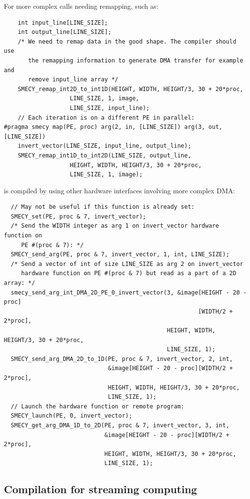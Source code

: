 \documentclass[a4paper]{article}
\begin{document}
For more complex calls needing remapping, such as:
\begin{lstlisting}
    int input_line[LINE_SIZE];
    int output_line[LINE_SIZE];
    /* We need to remap data in the good shape. The compiler should use
       the remapping information to generate DMA transfer for example and
       remove input_line array */
    SMECY_remap_int2D_to_int1D(HEIGHT, WIDTH, HEIGHT/3, 30 + 20*proc,
                   LINE_SIZE, 1, image,
                   LINE_SIZE, input_line);
    // Each iteration is on a different PE in parallel:
#pragma smecy map(PE, proc) arg(2, in, [LINE_SIZE]) arg(3, out, [LINE_SIZE])
    invert_vector(LINE_SIZE, input_line, output_line);
    SMECY_remap_int1D_to_int2D(LINE_SIZE, output_line,
                   HEIGHT, WIDTH, HEIGHT/3, 30 + 20*proc,
                   LINE_SIZE, 1, image);
\end{lstlisting}
is compiled by using other hardware interfaces involving more complex DMA:
\begin{lstlisting}
  // May not be useful if this function is already set:
  SMECY_set(PE, proc & 7, invert_vector);
  /* Send the WIDTH integer as arg 1 on invert_vector hardware function on
     PE #(proc & 7): */
  SMECY_send_arg(PE, proc & 7, invert_vector, 1, int, LINE_SIZE);
  /* Send a vector of int of size LINE_SIZE as arg 2 on invert_vector
     hardware function on PE #(proc & 7) but read as a part of a 2D array: */
  smecy_send_arg_int_DMA_2D_PE_0_invert_vector(3, &image[HEIGHT - 20 - proc]
                                                        [WIDTH/2 + 2*proc],
                                               HEIGHT, WIDTH, HEIGHT/3, 30 + 20*proc,
                                               LINE_SIZE, 1);
  SMECY_send_arg_DMA_2D_to_1D(PE, proc & 7, invert_vector, 2, int,
                              &image[HEIGHT - 20 - proc][WIDTH/2 + 2*proc],
                              HEIGHT, WIDTH, HEIGHT/3, 30 + 20*proc,
                              LINE_SIZE, 1);
  // Launch the hardware function or remote program:
  SMECY_launch(PE, 0, invert_vector);
  SMECY_get_arg_DMA_1D_to_2D(PE, proc & 7, invert_vector, 3, int,
                             &image[HEIGHT - 20 - proc][WIDTH/2 + 2*proc],
                             HEIGHT, WIDTH, HEIGHT/3, 30 + 20*proc,
                             LINE_SIZE, 1);
\end{lstlisting}


\subsection{Compilation for streaming computing}
\label{sec:comp-stre-comp}
\end{document}
